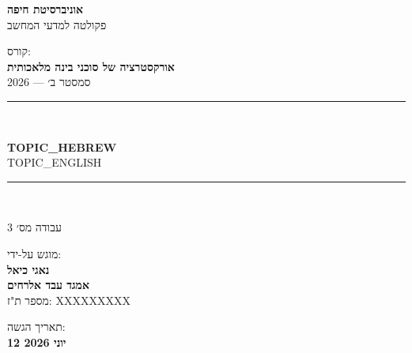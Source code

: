 \begin{titlepage}
    \centering
    \vspace*{1.5cm}

    {\large\textbf{אוניברסיטת חיפה}}\\
    \vspace{0.3em}
    {\normalsize פקולטה למדעי המחשב}\\
    \vspace{1.5cm}

    {\normalsize קורס:}\\
    \vspace{0.2em}
    {\large\textbf{אורקסטרציה של סוכני בינה מלאכותית}}\\
    \vspace{0.2em}
    {\normalsize סמסטר ב׳ --- 2026}\\
    \vspace{1.5cm}

    \rule{\linewidth}{1pt}\\
    \vspace{0.5cm}

    {\LARGE\bfseries {{TOPIC_HEBREW}}}\\
    \vspace{0.4em}
    {\large\foreignlanguage{english}{{{TOPIC_ENGLISH}}}}\\
    \vspace{0.3em}

    \rule{\linewidth}{1pt}\\
    \vspace{1.5cm}

    {\large עבודה מס׳ 3}\\
    \vspace{2cm}

    {\normalsize מוגש על-ידי:}\\
    \vspace{0.5em}
    {\large\textbf{נאגי כיאל}}\\
    \vspace{0.2em}
    {\large\textbf{אמגד עבד אלרחים}}\\
    \vspace{0.2em}
    {\normalsize מספר ת"ז: XXXXXXXXX}\\
    \vspace{1cm}

    \vfill
    {\normalsize תאריך הגשה:}\\
    \vspace{0.2em}
    {\large\textbf{12 יוני 2026}}\\
    \vspace{1cm}
\end{titlepage}
